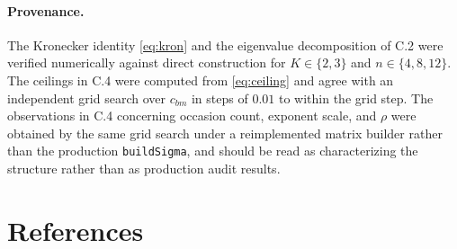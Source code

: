 \documentclass[
  11pt,
]{article}
\begin{document}
\paragraph{Provenance.}

The Kronecker identity \eqref{eq:kron} and
the eigenvalue decomposition of C.2 were verified numerically against
direct construction for \(K \in \{2,3\}\) and \(n \in \{4,8,12\}\). The
ceilings in C.4 were computed from \eqref{eq:ceiling} and agree with
an independent grid search over \(c_{bm}\) in steps of \(0.01\) to within
the grid step. The observations in C.4 concerning occasion count,
exponent scale, and \(\rho\) were obtained by the same grid search
under a reimplemented matrix builder rather than the production
\texttt{buildSigma}, and should be read as characterizing the
structure rather than as production audit results.

\section{References}\label{references}
\end{document}
